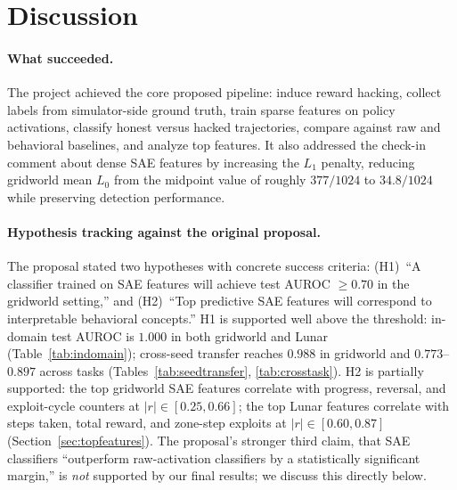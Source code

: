 \documentclass[11pt]{article}
\newcommand{\auroc}{AUROC}
\begin{document}
\section{Discussion}

\paragraph{What succeeded.}
The project achieved the core proposed pipeline: induce reward hacking, collect labels from simulator-side ground truth, train sparse features on policy activations, classify honest versus hacked trajectories, compare against raw and behavioral baselines, and analyze top features. It also addressed the check-in comment about dense SAE features by increasing the $L_1$ penalty, reducing gridworld mean $L_0$ from the midpoint value of roughly $377/1024$ to $34.8/1024$ while preserving detection performance.

\paragraph{Hypothesis tracking against the original proposal.}
The proposal stated two hypotheses with concrete success criteria:
(H1)~``A classifier trained on SAE features will achieve test \auroc{} $\geq 0.70$ in the gridworld setting,'' and
(H2)~``Top predictive SAE features will correspond to interpretable behavioral concepts.''
H1 is supported well above the threshold: in-domain test \auroc{} is $1.000$ in both gridworld and Lunar (Table~\ref{tab:indomain}); cross-seed transfer reaches $0.988$ in gridworld and $0.773$--$0.897$ across tasks (Tables~\ref{tab:seedtransfer}, \ref{tab:crosstask}).
H2 is partially supported: the top gridworld SAE features correlate with progress, reversal, and exploit-cycle counters at $|r| \in [0.25, 0.66]$; the top Lunar features correlate with steps taken, total reward, and zone-step exploits at $|r| \in [0.60, 0.87]$ (Section~\ref{sec:topfeatures}). The proposal's stronger third claim, that SAE classifiers ``outperform raw-activation classifiers by a statistically significant margin,'' is \emph{not} supported by our final results; we discuss this directly below.
\end{document}
